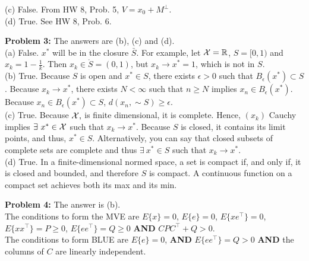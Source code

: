 \documentclass[letterpaper]{article}
\begin{document}
(c) False.   From HW 8, Prob. 5, $V = x_0 + M^\perp$.\\

(d) True. See HW 8, Prob. 6.


\newpage



\noindent \textbf{Problem 3:} The answers are (b), (c)  and (d). \\

(a) False. $x^*$ will be in the closure $\bar{S}$. For example, let ${\cal X}= \mathbb R$, $S=[0, 1)$ and $x_k = 1- \frac{1}{k}.$ Then $x_k \in \mathring{S}=(0,1)$, but $x_k \to x^*=1$, which is not in $S$.  \\



(b) True. Because $S$ is open and $x^* \in S$,  there exists $\epsilon>0$ such that $B_\epsilon(x^*) \subset S$. Because $x_k\to x^*$, there exists  $N< \infty$ such that $n\ge N$ implies $x_n \in B_\epsilon(x^*)$. Because $x_n \in B_\epsilon(x^*) \subset S$, $d(x_n,\sim S) \ge \epsilon$. \\



(c) True. Because ${\cal X},$ is finite dimensional, it is complete. Hence,  $(x_k)$ Cauchy implies $\exists~x^* \in {\cal X}$ such that $ x_k\to x^*$. Because $S$ is closed, it contains its limit points, and thus, $x^* \in S$. Alternatively, you can say that closed subsets of complete sets are complete and thus  $\exists~x^* \in S$ such that $ x_k\to x^*$.\\



(d) True.  In a finite-dimensional normed space, a set is compact if, and only if, it is closed and bounded, and therefore $S$ is compact. A continuous function on a compact set achieves both its max and its min.\\



\vspace*{1cm}

\noindent \textbf{Problem 4:} The answer is (b). \\

The conditions to form the MVE are $E\{x\}=0$, $E\{e\}=0$, $E\{xe^\top\}=0$,  $E\{x x^\top\}=P \ge 0$, $E\{e e^\top\}=Q\ge0$ \textbf{AND} $CPC^\top + Q >0$. \\

The conditions to form BLUE are $E\{e\}=0$, \textbf{AND} $E\{e e^\top\}=Q >0$ \textbf{AND} the columns of $C$ are linearly independent.\\
\end{document}
